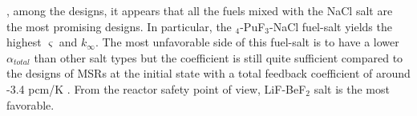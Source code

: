     \DIFdelbegin {}\DIFdelend \DIFaddbegin {}\DIFaddend , among the \DIFaddbegin {}\DIFaddend designs, it appears that all the fuels mixed with the NaCl salt are the most promising designs. In particular, the \DIFdelbegin {}\DIFdelend \DIFaddbegin {}\DIFaddend $_4$-PuF$_3$-NaCl fuel-salt yields the highest $\varsigma$ and $k_{\infty}$. The most unfavorable side of this fuel-salt is to have a lower ${\alpha_{total}}$ than other salt types but the coefficient is still quite sufficient compared to the \DIFdelbegin {}\DIFdelend \DIFaddbegin {}\DIFaddend designs of \gls{MSR}s at the initial state with a total \DIFdelbegin {}\DIFdelend \DIFaddbegin {}\DIFaddend feedback coefficient of around -3.4 pcm/K \cite{rykhlevskii2019, robertson1971}. From the reactor safety point of view, \DIFdelbegin {}\DIFdelend \DIFaddbegin {}\DIFaddend LiF-BeF$_2$ salt \DIFaddbegin {}\DIFaddend is the most favorable.

